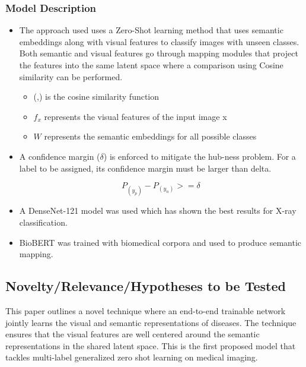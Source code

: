 \documentclass[letterpaper]{article} %
\begin{document}
\subsubsection{Model Description}

\begin{itemize}

\item The approach used uses a Zero-Shot learning method that uses semantic embeddings along with visual features to classify images with unseen classes. Both semantic and visual features go through mapping modules that project the features into the same latent space where a comparison using Cosine            similarity can be performed.
\begin{itemize}
\[P^x_C = (f_x,W)\]
where
\item (,) is the cosine similarity function
\item \(f_x\) represents the visual features of the input image x
\item \(W\) represents the semantic embeddings for all possible classes


\end{itemize}


\item A confidence margin (\( \delta \)) is enforced to mitigate the hub-ness problem. For a label to be assigned, its confidence margin must be larger than delta. 
    \begin{itemize}

\[P_(y_p) - P_(y_n) >= \delta\ \]

    \end{itemize}
    \item A DenseNet-121 model was used which has shown the best results for X-ray classification.
    \item BioBERT was trained with biomedical corpora and used to produce semantic mapping.
\end{itemize}

\subsection{Novelty/Relevance/Hypotheses to be Tested}

This paper outlines a novel technique where an end-to-end trainable network jointly
learns the visual and semantic representations of diseases. The technique ensures that
the visual features are well centered around the semantic representations in the
shared latent space. This is the first proposed model that tackles multi-label
generalized zero shot learning on medical imaging.
\end{document}
